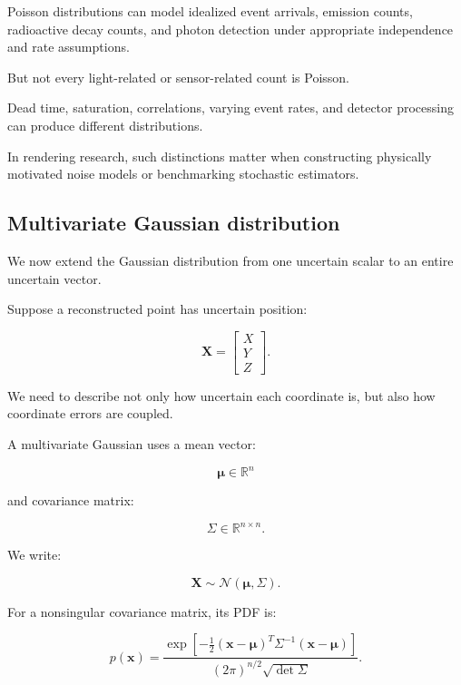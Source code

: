 \hypertarget{02-foundations-ii-ch024-poisson-counts-in-physical-simulation}{}

Poisson distributions can model idealized event arrivals, emission counts, radioactive decay counts, and photon detection under appropriate independence and rate assumptions.

But not every light-related or sensor-related count is Poisson.

Dead time, saturation, correlations, varying event rates, and detector processing can produce different distributions.

In rendering research, such distinctions matter when constructing physically motivated noise models or benchmarking stochastic estimators.

\subsection{Multivariate Gaussian distribution}\label{02-foundations-ii-ch024-multivariate-gaussian-distribution}

\hypertarget{02-foundations-ii-ch024-multivariate-gaussian-distribution}{}

We now extend the Gaussian distribution from one uncertain scalar to an entire uncertain vector.

Suppose a reconstructed point has uncertain position:

\[
 \mathbf X= \begin{bmatrix} X\\Y\\Z \end{bmatrix}.
\]

We need to describe not only how uncertain each coordinate is, but also how coordinate errors are coupled.

A multivariate Gaussian uses a mean vector:

\[
 \boldsymbol\mu\in\mathbb R^n
\]

and covariance matrix:

\[
 \Sigma\in\mathbb R^{n\times n}.
\]

We write:

\[
 \boxed{ \mathbf X\sim\mathcal N(\boldsymbol\mu,\Sigma) }.
\]

For a nonsingular covariance matrix, its PDF is:

\[
 \boxed{ p(\mathbf x)= \frac{ \exp\left[ -\frac12(\mathbf x-\boldsymbol\mu)^T \Sigma^{-1} (\mathbf x-\boldsymbol\mu) \right] }{ (2\pi)^{n/2}\sqrt{\det\Sigma} } }.
\]

